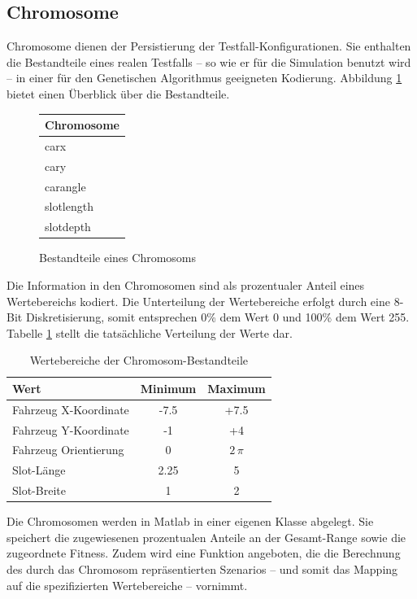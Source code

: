 \documentclass[12pt,a4paper]{scrartcl}
\begin{document}
\subsection{Chromosome}
Chromosome dienen der Persistierung der Testfall-Konfigurationen. Sie enthalten die Bestandteile eines realen Testfalls -- so wie er für die Simulation benutzt wird -- in einer für den Genetischen Algorithmus geeigneten Kodierung. Abbildung \ref{fig:chromosome} bietet einen Überblick über die Bestandteile.
\begin{figure}[H]
\centering
\begin{tabular}{|l|}
\hline
Chromosome\\
\hline
carx \\
cary\\
carangle\\
slotlength\\
slotdepth\\
\hline
\end{tabular}
\caption{Bestandteile eines Chromosoms}
\label{fig:chromosome}
\end{figure}
Die Information in den Chromosomen sind als prozentualer Anteil eines Wertebereichs kodiert. Die Unterteilung der Wertebereiche erfolgt durch eine 8-Bit Diskretisierung, somit entsprechen 0\% dem Wert 0 und 100\% dem Wert 255. Tabelle \ref{tab:ranges} stellt die tatsächliche Verteilung der Werte dar. 
\begin{table}[H]
\centering
\begin{tabular}{l|c|c}
Wert & Minimum & Maximum \\\hline
Fahrzeug X-Koordinate & -7.5 & +7.5 \\
Fahrzeug Y-Koordinate & -1 & +4 \\
Fahrzeug Orientierung & 0 & $2\,\pi$\\
Slot-Länge & 2.25 & 5 \\
Slot-Breite & 1 & 2 \\
\end{tabular}
\caption{Wertebereiche der Chromosom-Bestandteile}
\label{tab:ranges}
\end{table}
Die Chromosomen werden in Matlab in einer eigenen Klasse abgelegt. Sie speichert die zugewiesenen prozentualen Anteile an der Gesamt-Range sowie die zugeordnete Fitness. Zudem wird eine Funktion angeboten, die die Berechnung des durch das Chromosom repräsentierten Szenarios -- und somit das Mapping auf die spezifizierten Wertebereiche -- vornimmt.
\end{document}
